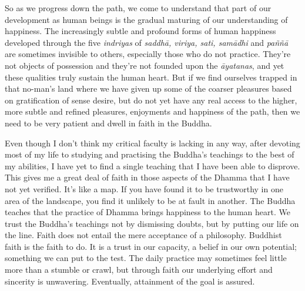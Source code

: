 So as we progress down the path, we come to understand that part of our
development as human beings is the gradual maturing of our understanding
of happiness. The increasingly subtle and profound forms of human
happiness developed through the five \emph{indriyas} of \emph{saddhā, 
viriya, sati, samādhi} and \emph{paññā} are sometimes invisible to
others, especially those who do not practice. They're not objects of
possession and they're not founded upon the \emph{āyatanas}, and yet
these qualities truly sustain the human heart. But if we find ourselves
trapped in that no-man's land where we have given up some of the coarser
pleasures based on gratification of sense desire, but do not yet have
any real access to the higher, more subtle and refined pleasures, 
enjoyments and happiness of the path, then we need to be very patient
and dwell in faith in the Buddha. 

Even though I don't think my critical faculty is lacking in any way, 
after devoting most of my life to studying and practising the Buddha's
teachings to the best of my abilities, I have yet to find a single
teaching that I have been able to disprove. This gives me a great deal
of faith in those aspects of the Dhamma that I have not yet verified. 
It's like a map. If you have found it to be trustworthy in one area of
the landscape, you find it unlikely to be at fault in another. The
Buddha teaches that the practice of Dhamma brings happiness to the human
heart. We trust the Buddha's teachings not by dismissing doubts, but by
putting our life on the line. Faith does not entail the mere acceptance
of a philosophy. Buddhist faith is the faith to do. It is a trust in our
capacity, a belief in our own potential; something we can put to the
test. The daily practice may sometimes feel little more than a stumble
or crawl, but through faith our underlying effort and sincerity is
unwavering. Eventually, attainment of the goal is assured. 

